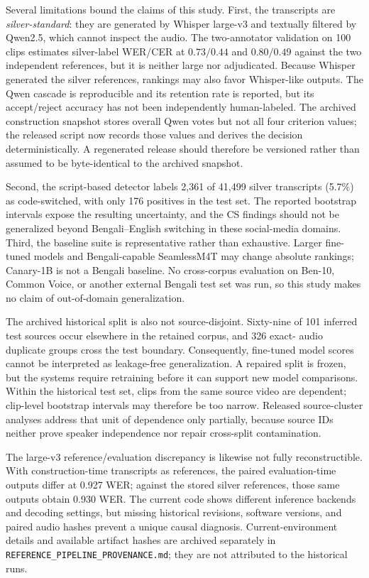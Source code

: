 \documentclass[journal]{IEEEtran}
\begin{document}
Several limitations bound the claims of this study. First, the transcripts are
\emph{silver-standard}: they are generated by Whisper large-v3 and textually
filtered by Qwen2.5, which cannot inspect the audio. The two-annotator
validation on 100 clips estimates silver-label WER/CER at $0.73/0.44$ and
$0.80/0.49$ against the two independent references, but it is neither large nor
adjudicated. Because Whisper generated the silver references, rankings may also
favor Whisper-like outputs. The Qwen cascade is reproducible and its retention
rate is reported, but its accept/reject accuracy has not been independently
human-labeled. The archived construction snapshot stores overall Qwen votes but
not all four criterion values; the released script now records those values and
derives the decision deterministically. A regenerated release should therefore
be versioned rather than assumed to be byte-identical to the archived snapshot.

Second, the script-based detector labels 2{,}361 of 41{,}499 silver transcripts
(5.7\%) as code-switched, with only 176 positives in the test set. The reported bootstrap intervals
expose the resulting uncertainty, and the CS findings should not be generalized
beyond Bengali--English switching in these social-media domains. Third, the
baseline suite is representative rather than exhaustive. Larger fine-tuned
models and Bengali-capable SeamlessM4T may change absolute rankings; Canary-1B
is not a Bengali baseline. No cross-corpus evaluation on Ben-10, Common Voice,
or another external Bengali test set was run, so this study makes no claim of
out-of-domain generalization.

The archived historical split is also not source-disjoint. Sixty-nine of 101
inferred test sources occur elsewhere in the retained corpus, and 326 exact-
audio duplicate groups cross the test boundary. Consequently, fine-tuned model
scores cannot be interpreted as leakage-free generalization. A repaired split
is frozen, but the systems require retraining before it can support new model
comparisons. Within the historical test set, clips from the same source video
are dependent; clip-level bootstrap intervals may therefore be too narrow.
Released source-cluster analyses address that unit of dependence only
partially, because source IDs neither prove speaker independence nor repair
cross-split contamination.

The large-v3 reference/evaluation discrepancy is likewise not fully
reconstructible. With construction-time transcripts as references, the paired
evaluation-time outputs differ at 0.927 WER; against the stored silver
references, those same outputs obtain 0.930 WER. The current code shows
different inference backends and decoding settings, but missing historical
revisions, software versions, and paired audio hashes prevent a unique causal
diagnosis. Current-environment details and available artifact hashes are
archived separately in 
\texttt{REFERENCE\_PIPELINE\_PROVENANCE.md}; they are not attributed to the
historical runs.
\end{document}
